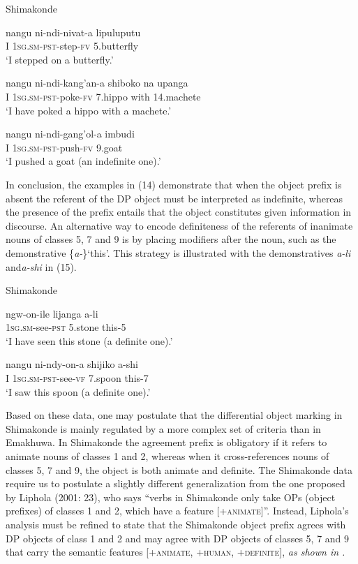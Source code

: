 \documentclass[output=paper]{langsci/langscibook}
\begin{document}
{Shimakonde}

\ea
\gll nangu        ni-ndi-nivat-a                 lipuluputu\\
     I                \textsc{1sg.sm-pst}{}-step-\textsc{fv}        5.butterfly\\
\glt ‘I stepped on a butterfly.’
\z

\ea
\gll nangu        ni-ndi-kang'an-a             shiboko           na       upanga\\
     I                \textsc{1sg.sm-pst}{}-poke-\textsc{fv}       7.hippo            with   14.machete\\
\glt ‘I have poked a hippo with a machete.’
\z

\ea
\gll nangu        ni-ndi-gang'ol-a             imbudi\\
     I                \textsc{1sg.sm-pst}{}-push-\textsc{fv}       9.goat\\
\glt ‘I pushed a goat (an indefinite one).’
\z

{In conclusion, the examples in }(14) {demonstrate that when the object prefix is absent the referent of the DP object must be interpreted as indefinite, whereas the presence of the prefix entails that the object constitutes given information in discourse. }{An alternative way to encode definiteness of the referents of inanimate nouns of classes 5, 7 and 9 is by placing modifiers after the noun, such as the demonstrative \{}{\textit{a-}}{\}}{\textit {}}{‘this’. This strategy is illustrated with the demonstratives }{\textit{a-li }}{and}{\textit {a-shi}} {in }(15){.}

{{Shimakonde}}

\ea
\gll ngw-on-ile               lijanga        a-li\\
     \textsc{1sg.sm}{}-see-\textsc{pst}       5.stone        this-5\\
\glt ‘I have seen this stone (a definite one).’
\z

\ea
\gll nangu      ni-ndy-on-a                shijiko         a-shi\\
     I              \textsc{1sg.sm-pst}{}-see-\textsc{vf }     7.spoon       this-7\\
\glt ‘I saw this spoon (a definite one).’
\z

{Based on these data, one may postulate that the differential object mar}{king in Shimakonde is mainly regulated by a more complex set of criteria than in }{Emakhuwa}{. In Shimakonde the agreement prefix is obligatory if it refers to animate nouns of classes 1 and 2, whereas when it cross-references nouns of classes 5, 7 and 9, the object is both animate and definite. }{The Shimakonde data require us to postulate a slightly different generalization from the one proposed by Liphola (2001}{: 23), who says “verbs in Shimakonde only take OPs (object prefixes) of classes 1 and 2, which have a feature [+}{\textsc{animate}}{]”. Instead, Liphola’s analysis must be refined to state that the Shimakonde object prefix agrees with DP objects of class 1 and 2 and may agree with DP objects of classes 5, 7 and 9 that carry the semantic features }{\textsc{[+animate, +human, +definite], }}\emph{\textup{as shown in .}}
\end{document}
